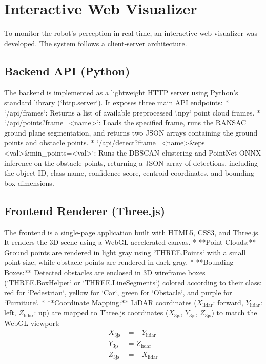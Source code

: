 \documentclass[a4paper,twocolumn]{article}
\begin{document}
\section{Interactive Web Visualizer}
To monitor the robot's perception in real time, an interactive web visualizer was developed. The system follows a client-server architecture.

\subsection{Backend API (Python)}
The backend is implemented as a lightweight HTTP server using Python's standard library (`http.server`). It exposes three main API endpoints:
*   `/api/frames`: Returns a list of available preprocessed `.npy` point cloud frames.
*   `/api/points?frame=<name>`: Loads the specified frame, runs the RANSAC ground plane segmentation, and returns two JSON arrays containing the ground points and obstacle points.
*   `/api/detect?frame=<name>&eps=<val>&min_points=<val>`: Runs the DBSCAN clustering and PointNet ONNX inference on the obstacle points, returning a JSON array of detections, including the object ID, class name, confidence score, centroid coordinates, and bounding box dimensions.

\subsection{Frontend Renderer (Three.js)}
The frontend is a single-page application built with HTML5, CSS3, and Three.js. It renders the 3D scene using a WebGL-accelerated canvas.
*   **Point Clouds:** Ground points are rendered in light gray using `THREE.Points` with a small point size, while obstacle points are rendered in dark gray.
*   **Bounding Boxes:** Detected obstacles are enclosed in 3D wireframe boxes (`THREE.BoxHelper` or `THREE.LineSegments`) colored according to their class: red for `Pedestrian`, yellow for `Car`, green for `Obstacle`, and purple for `Furniture`.
*   **Coordinate Mapping:** LiDAR coordinates ($X_{\text{lidar}}$: forward, $Y_{\text{lidar}}$: left, $Z_{\text{lidar}}$: up) are mapped to Three.js coordinates ($X_{\text{3js}}$, $Y_{\text{3js}}$, $Z_{\text{3js}}$) to match the WebGL viewport:
    \begin{align*}
    X_{\text{3js}} &= -Y_{\text{lidar}} \\
    Y_{\text{3js}} &= Z_{\text{lidar}} \\
    Z_{\text{3js}} &= -X_{\text{lidar}}
    \end{align*}
\end{document}
